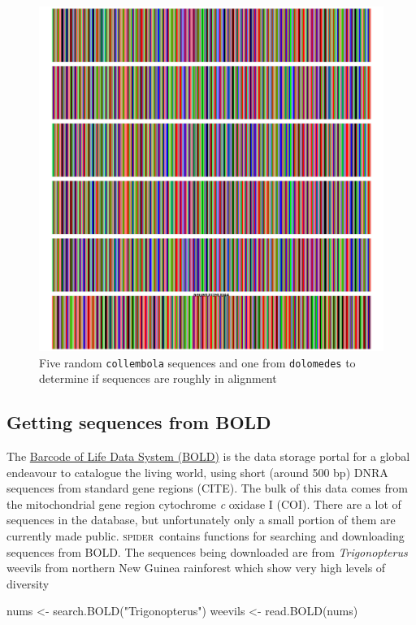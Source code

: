 \documentclass{article}
\newcommand{\spider}{\textsc{spider}~} %
\newcommand{\scinm}{\emph}
\newcommand{\fun}[1]{\texttt{#1}}
\begin{document}
\begin{figure}[tbp]
	\includegraphics[width=\textwidth]{seeBarcode}
	\caption{Five random \fun{collembola} sequences and one from \fun{dolomedes} to determine if sequences are roughly in alignment}
	\label{seeBarcode.fig}
\end{figure}



\subsection{Getting sequences from BOLD}
\label{BOLD.section}
The \href{http://www.barcodinglife.com}{Barcode of Life Data System (BOLD)} is the data storage portal for a global endeavour to catalogue the living world, using short (around 500 bp) DNRA sequences from standard gene regions (CITE). The bulk of this data comes from the mitochondrial gene region cytochrome \emph{c} oxidase I (COI). There are a lot of sequences in the database, but unfortunately only a small portion of them are currently made public. \spider contains functions for searching and downloading sequences from BOLD. The sequences being downloaded are from \scinm{Trigonopterus} weevils from northern New Guinea rainforest which show very high levels of diversity \citep{Ried.etal.2010,Ried.2010}

\begin{console}
nums <- search.BOLD("Trigonopterus")
weevils <- read.BOLD(nums)
\end{console}
\end{document}
